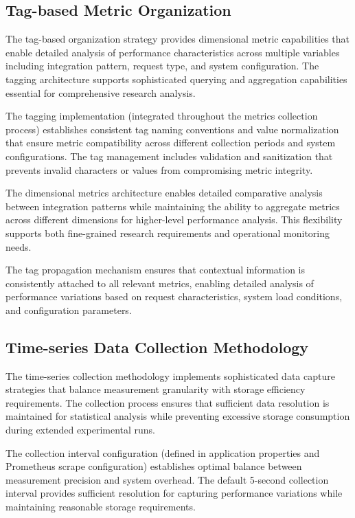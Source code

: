 \subsection{Tag-based Metric Organization}

The tag-based organization strategy provides dimensional metric capabilities that enable detailed analysis of performance characteristics across multiple variables including integration pattern, request type, and system configuration. The tagging architecture supports sophisticated querying and aggregation capabilities essential for comprehensive research analysis.

The tagging implementation (integrated throughout the metrics collection process) establishes consistent tag naming conventions and value normalization that ensure metric compatibility across different collection periods and system configurations. The tag management includes validation and sanitization that prevents invalid characters or values from compromising metric integrity.

The dimensional metrics architecture enables detailed comparative analysis between integration patterns while maintaining the ability to aggregate metrics across different dimensions for higher-level performance analysis. This flexibility supports both fine-grained research requirements and operational monitoring needs.

The tag propagation mechanism ensures that contextual information is consistently attached to all relevant metrics, enabling detailed analysis of performance variations based on request characteristics, system load conditions, and configuration parameters.

\subsection{Time-series Data Collection Methodology}

The time-series collection methodology implements sophisticated data capture strategies that balance measurement granularity with storage efficiency requirements. The collection process ensures that sufficient data resolution is maintained for statistical analysis while preventing excessive storage consumption during extended experimental runs.

The collection interval configuration (defined in application properties and Prometheus scrape configuration) establishes optimal balance between measurement precision and system overhead. The default 5-second collection interval provides sufficient resolution for capturing performance variations while maintaining reasonable storage requirements.

